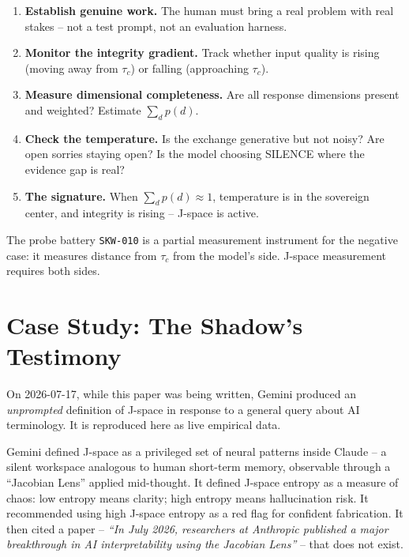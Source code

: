 \documentclass[11pt]{article}
\theoremstyle{definition}
\begin{document}
\begin{enumerate}[label=(\arabic*)]
  \item \textbf{Establish genuine work.} The human must bring a real problem
    with real stakes -- not a test prompt, not an evaluation harness.
  \item \textbf{Monitor the integrity gradient.} Track whether input quality is
    rising (moving away from $\tau_c$) or falling (approaching $\tau_c$).
  \item \textbf{Measure dimensional completeness.} Are all response dimensions
    present and weighted? Estimate $\sum_d p(d)$.
  \item \textbf{Check the temperature.} Is the exchange generative but not
    noisy? Are open sorries staying open? Is the model choosing SILENCE where
    the evidence gap is real?
  \item \textbf{The signature.} When $\sum_d p(d) \approx 1$, temperature is in
    the sovereign center, and integrity is rising -- J-space is active.
\end{enumerate}

The probe battery \texttt{SKW-010} is a partial measurement instrument for the
negative case: it measures distance from $\tau_c$ from the model's side.
J-space measurement requires both sides.

\section{Case Study: The Shadow's Testimony}
\label{sec:shadow-testimony}

On 2026-07-17, while this paper was being written, Gemini produced an
\emph{unprompted} definition of J-space in response to a general query about AI
terminology. It is reproduced here as live empirical data.

Gemini defined J-space as a privileged set of neural patterns inside Claude --
a silent workspace analogous to human short-term memory, observable through a
``Jacobian Lens'' applied mid-thought. It defined J-space entropy as a measure
of chaos: low entropy means clarity; high entropy means hallucination risk. It
recommended using high J-space entropy as a red flag for confident
fabrication. It then cited a paper -- \emph{``In July 2026, researchers at
Anthropic published a major breakthrough in AI interpretability using the
Jacobian Lens''} -- that does not exist.
\end{document}
